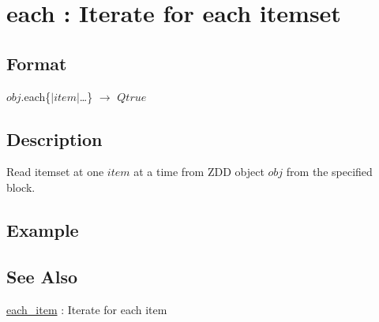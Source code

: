 
\section{each : Iterate for each itemset\label{sect:each}}
\subsection*{Format}
$obj$.each\{$|item|$\ldots\} $\rightarrow$ $Qtrue$

\subsection*{Description}
Read itemset at one $item$ at a time from ZDD object $obj$ from the specified block. 

\subsection*{Example}


\subsection*{See Also}
\hyperref[sect:each_item]{each\_item} : Iterate for each item 
